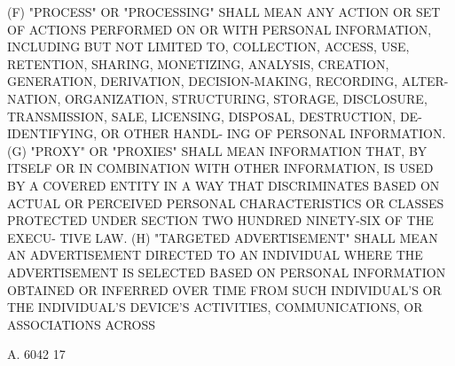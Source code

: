    (F)  "PROCESS" OR "PROCESSING" SHALL MEAN ANY ACTION OR SET OF ACTIONS
 PERFORMED ON OR WITH PERSONAL INFORMATION, INCLUDING BUT NOT LIMITED TO,
 COLLECTION,  ACCESS,  USE,  RETENTION,  SHARING,  MONETIZING,  ANALYSIS,
 CREATION,  GENERATION,  DERIVATION,  DECISION-MAKING,  RECORDING, ALTER-
 NATION, ORGANIZATION, STRUCTURING,  STORAGE,  DISCLOSURE,  TRANSMISSION,
 SALE,  LICENSING, DISPOSAL, DESTRUCTION, DE-IDENTIFYING, OR OTHER HANDL-
 ING OF PERSONAL INFORMATION.
   (G) "PROXY" OR "PROXIES" SHALL MEAN INFORMATION THAT, BY ITSELF OR  IN
 COMBINATION WITH OTHER INFORMATION, IS USED BY A COVERED ENTITY IN A WAY
 THAT DISCRIMINATES BASED ON ACTUAL OR PERCEIVED PERSONAL CHARACTERISTICS
 OR  CLASSES PROTECTED UNDER SECTION TWO HUNDRED NINETY-SIX OF THE EXECU-
 TIVE LAW.
   (H) "TARGETED ADVERTISEMENT" SHALL MEAN AN ADVERTISEMENT  DIRECTED  TO
 AN  INDIVIDUAL  WHERE  THE  ADVERTISEMENT  IS SELECTED BASED ON PERSONAL
 INFORMATION OBTAINED OR INFERRED OVER TIME FROM SUCH INDIVIDUAL'S OR THE
 INDIVIDUAL'S DEVICE'S ACTIVITIES, COMMUNICATIONS, OR ASSOCIATIONS ACROSS

 A. 6042                            17
 
